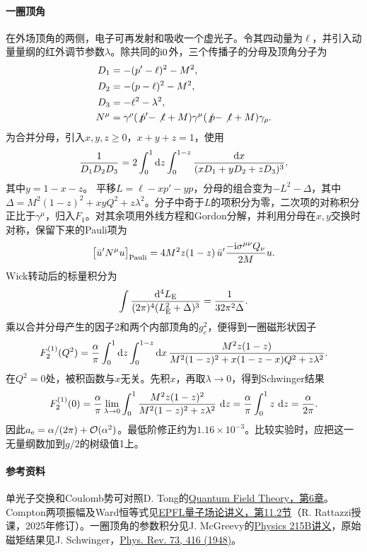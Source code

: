 \paragraph{一圈顶角}
在外场顶角的两侧，电子可再发射和吸收一个虚光子。令其四动量为$\ell$，并引入动量量纲的红外调节参数$\lambda$。除共同的$\mathrm{i}0$外，三个传播子的分母及顶角分子为
\begin{align*}
    D_1 &= -(p' - \ell)^2 - M^2,\\
    D_2 &= -(p - \ell)^2 - M^2,\\
    D_3 &= -\ell^2 - \lambda^2,\\
    N^\mu &= \gamma^\rho(\not p' - \not\ell + M)\gamma^\mu
                (\not p - \not\ell + M)\gamma_\rho .
\end{align*}
为合并分母，引入$x,y,z \ge 0$，$x + y + z = 1$，使用
\[
    \frac1{D_1D_2D_3}
    = 2\int_0^1\mathop{}\!\mathrm{d} z\int_0^{1-z}\frac{\mathop{}\!\mathrm{d} x}{(xD_1 + yD_2 + zD_3)^3}.
\]
其中$y = 1 - x - z$。
平移$L = \ell - xp' - yp$，分母的组合变为$-L^2 - \Delta$，其中$\Delta = M^2(1 - z)^2 + xyQ^2 + z\lambda^2$。分子中奇于$L$的项积分为零，二次项的对称积分正比于$\gamma^\mu$，归入$F_1$。对其余项用外线方程和Gordon分解，并利用分母在$x,y$交换时对称，保留下来的Pauli项为
\[
    \big[\bar u'N^\mu u\big]_\mathrm{Pauli}
      = 4M^2z(1 - z)\,\bar u'\frac{-\mathrm{i}\sigma^{\mu\nu}Q_\nu}{2M}u .
\]
Wick转动后的标量积分为
\[
    \int\frac{\mathop{}\!\mathrm{d}^4L_\mathrm{E}}{(2\pi)^4(L_\mathrm{E}^2 + \Delta)^3} = \frac{1}{32\pi^2\Delta}.
\]
乘以合并分母产生的因子2和两个内部顶角的$g_e^2$，便得到一圈磁形状因子
\begin{equation}
    F_2^{(1)}(Q^2) = \frac{\alpha}{\pi}
      \int_0^1\mathop{}\!\mathrm{d} z\int_0^{1-z}\mathop{}\!\mathrm{d} x\,
        \frac{M^2z(1 - z)}{M^2(1 - z)^2 + x(1 - z - x)Q^2 + z\lambda^2}.
\end{equation}
在$Q^2 = 0$处，被积函数与$x$无关。先积$x$，再取$\lambda \to 0$，得到Schwinger结果
\begin{equation}
    \label{eq:ed-schwinger-moment}
    F_2^{(1)}(0) = \frac{\alpha}{\pi}\lim_{\lambda\to0}
       \int_0^1\frac{M^2z(1 - z)^2}{M^2(1 - z)^2 + z\lambda^2}\,\mathop{}\!\mathrm{d} z
       = \frac{\alpha}{\pi}\int_0^1 z\,\mathop{}\!\mathrm{d} z = \frac{\alpha}{2\pi}.
\end{equation}
因此$a_{\mathrm{e}} = \alpha/(2\pi) + \mathcal{O}(\alpha^2)$。最低阶修正约为$1.16 \times 10^{-3}$。比较实验时，应把这一无量纲数加到$g/2$的树级值1上。

\paragraph{参考资料}
单光子交换和Coulomb势可对照D. Tong的\href{https://www.damtp.cam.ac.uk/user/tong/qft/qfthtml/S6.html}{Quantum Field Theory，第6章}。Compton两项振幅及Ward恒等式见\href{https://www.epfl.ch/labs/lptp/wp-content/uploads/2025/04/NewQFTLectureNotes_03_2025.pdf}{EPFL量子场论讲义，第11.2节}（R. Rattazzi授课，2025年修订）。一圈顶角的参数积分见J. McGreevy的\href{https://mcgreevy.physics.ucsd.edu/w20/2020-215B-lectures.pdf}{Physics 215B讲义}，原始磁矩结果见J. Schwinger，\href{https://doi.org/10.1103/PhysRev.73.416}{Phys. Rev. 73, 416 (1948)}。
